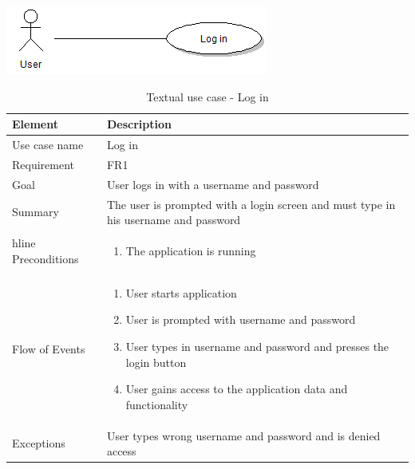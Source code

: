 \begin{table}[h!]
\begin{center}
\begin{center}
\includegraphics[width=\textwidth]{login}
\end{center}
\begin{tabular}{p{3cm}|p{12cm}} \hline
\textbf{Element} & \textbf{Description} \\ \hline \hline
Use case name & Log in \\ 
Requirement & FR1 \\
Goal & User logs in with a username and password \\ \hline
Summary &The user is prompted with a login screen and must type in his username and password \\hline
Preconditions &
\begin{enumerate}
\item{}The application is running
\end{enumerate} \\ \hline
Flow of Events &
\begin{enumerate}
\item{}User starts application
\item{}User is prompted with username and password
\item{}User types in username and password and presses the login button
\item{}User gains access to the application data and functionality
\end{enumerate} \\ \hline
Exceptions & User types wrong username and password and is denied access \\ \hline
\end{tabular}
\end{center}
\caption{Textual use case - Log in} \label{tab:login}
\end{table}

